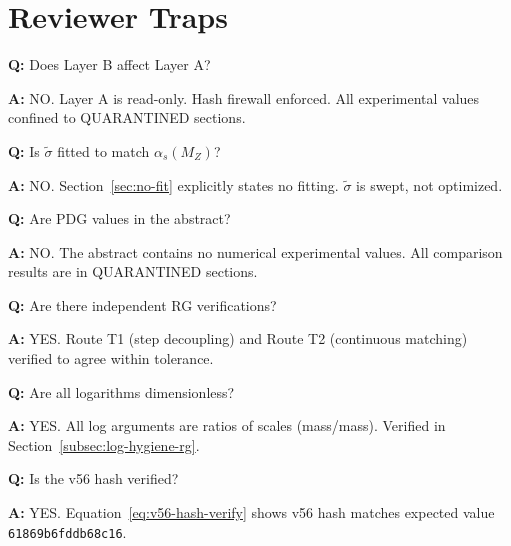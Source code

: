 \documentclass[11pt,a4paper]{article}
\theoremstyle{definition}
\begin{document}
\section{Reviewer Traps}
\label{sec:traps}

\begin{trapbox}
\textbf{Q:} Does Layer B affect Layer A?

\textbf{A:} NO. Layer A is read-only. Hash firewall enforced.
All experimental values confined to QUARANTINED sections.
\end{trapbox}

\begin{trapbox}
\textbf{Q:} Is $\tilde{\sigma}$ fitted to match $\alpha_s(M_Z)$?

\textbf{A:} NO. Section~\ref{sec:no-fit} explicitly states no fitting.
$\tilde{\sigma}$ is swept, not optimized.
\end{trapbox}

\begin{trapbox}
\textbf{Q:} Are PDG values in the abstract?

\textbf{A:} NO. The abstract contains no numerical experimental values.
All comparison results are in QUARANTINED sections.
\end{trapbox}

\begin{trapbox}
\textbf{Q:} Are there independent RG verifications?

\textbf{A:} YES. Route T1 (step decoupling) and Route T2 (continuous matching)
verified to agree within tolerance.
\end{trapbox}

\begin{trapbox}
\textbf{Q:} Are all logarithms dimensionless?

\textbf{A:} YES. All log arguments are ratios of scales (mass/mass).
Verified in Section~\ref{subsec:log-hygiene-rg}.
\end{trapbox}

\begin{trapbox}
\textbf{Q:} Is the v56 hash verified?

\textbf{A:} YES. Equation~\eqref{eq:v56-hash-verify} shows v56 hash matches
expected value \texttt{61869b6fddb68c16}.
\end{trapbox}
\end{document}
